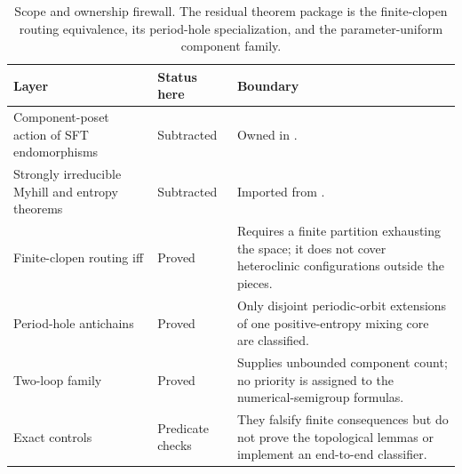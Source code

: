 \begin{table}[H]
\centering
\caption{Scope and ownership firewall.  The residual theorem package is the
finite-clopen routing equivalence, its period-hole specialization, and the
parameter-uniform component family.}
\label{tab:boundary}
\small
\begin{tabularx}{\textwidth}{@{}>{\raggedright\arraybackslash}p{35mm}
  >{\raggedright\arraybackslash}p{25mm}X@{}}
\toprule
Layer & Status here & Boundary \\
\midrule
Component-poset action of SFT endomorphisms & Subtracted & Owned in
\cite[Propositions~3.14--3.15]{ceccheriniCoornaertSalo2026}. \\
Strongly irreducible Myhill and entropy theorems & Subtracted & Imported from
\cite[Theorems~1.1 and~5.1]{ceccheriniCoornaert2012}. \\
Finite-clopen routing iff & Proved & Requires a finite partition exhausting
the space; it does not cover heteroclinic configurations outside the pieces. \\
Period-hole antichains & Proved & Only disjoint periodic-orbit extensions of
one positive-entropy mixing core are classified. \\
Two-loop family & Proved & Supplies unbounded component count; no priority is
assigned to the numerical-semigroup formulas. \\
Exact controls & Predicate checks & They falsify finite consequences but do
not prove the topological lemmas or implement an end-to-end classifier. \\
\bottomrule
\end{tabularx}
\end{table}
